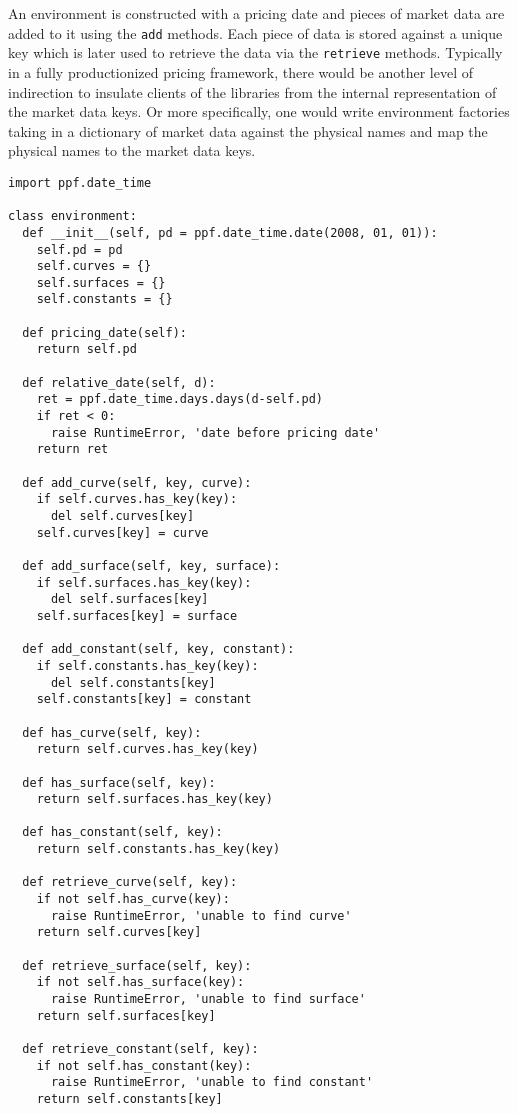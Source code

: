 An environment is constructed with a pricing date and pieces of market data are 
added to it using the \verb|add| methods. Each piece of data is stored against a unique 
key which is later used to retrieve the data via the \verb|retrieve| methods. Typically in 
a fully productionized pricing framework, there would be another level of indirection 
to insulate clients of the libraries from the internal representation of the market data keys. 
Or more specifically, one would write environment factories taking in a dictionary of market data 
against the physical names and map the physical names to the market data keys.   
\begin{verbatim}
import ppf.date_time

class environment:
  def __init__(self, pd = ppf.date_time.date(2008, 01, 01)):
    self.pd = pd
    self.curves = {}
    self.surfaces = {}
    self.constants = {}

  def pricing_date(self):
    return self.pd

  def relative_date(self, d):
    ret = ppf.date_time.days.days(d-self.pd)
    if ret < 0:
      raise RuntimeError, 'date before pricing date'
    return ret
    
  def add_curve(self, key, curve):
    if self.curves.has_key(key):
      del self.curves[key]
    self.curves[key] = curve 

  def add_surface(self, key, surface):
    if self.surfaces.has_key(key):
      del self.surfaces[key]
    self.surfaces[key] = surface

  def add_constant(self, key, constant):
    if self.constants.has_key(key):
      del self.constants[key]
    self.constants[key] = constant 

  def has_curve(self, key):
    return self.curves.has_key(key)

  def has_surface(self, key):
    return self.surfaces.has_key(key)

  def has_constant(self, key):
    return self.constants.has_key(key)

  def retrieve_curve(self, key):
    if not self.has_curve(key):
      raise RuntimeError, 'unable to find curve'
    return self.curves[key]

  def retrieve_surface(self, key):
    if not self.has_surface(key):
      raise RuntimeError, 'unable to find surface'
    return self.surfaces[key]

  def retrieve_constant(self, key):
    if not self.has_constant(key):
      raise RuntimeError, 'unable to find constant'
    return self.constants[key]
\end{verbatim}
